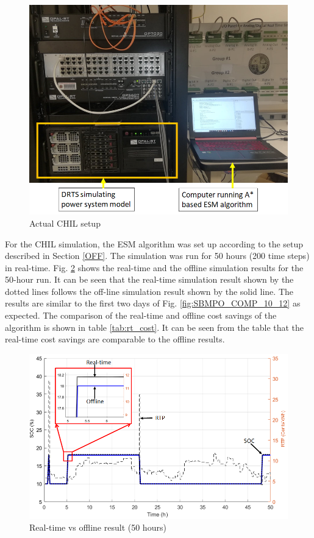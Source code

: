 \begin{figure}[!ht]
    \centering
    \includegraphics[width = 0.8\linewidth]{figs/LAB_REAL.png}
    \caption{Actual CHIL setup}
    \label{fig:LAB_REAL}
\end{figure}

For the CHIL simulation, the ESM algorithm was set up according to the setup described in Section \ref{OFF}. The simulation was run for 50 hours (200 time steps) in real-time. Fig. \ref{fig:RT_TESTING} shows the real-time and the offline simulation results for the 50-hour run. It can be seen that the real-time simulation result shown by the dotted lines follows the off-line simulation result shown by the solid line. The results are similar to the first two days of Fig. \ref{fig:SBMPO_COMP_10_12} as expected. The comparison of the real-time and offline cost savings of the algorithm is shown in table \ref{tab:rt_cost}. It can be seen from the table that the real-time cost savings are comparable to the offline results.

\begin{figure}[!ht]
    \centering
    \includegraphics[width = \linewidth]{figs/RT_TESTING.png}
    \caption{Real-time vs offline result (50  hours)}
    \label{fig:RT_TESTING}
\end{figure}


